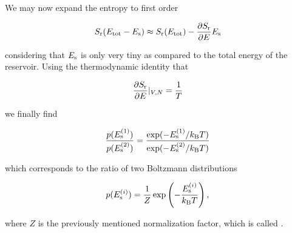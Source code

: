 \documentclass[letterpaper,10pt,english]{sphinxmanual}
\begin{document}
\sphinxAtStartPar
We may now expand the entropy to first order

\sphinxAtStartPar
\begin{equation}
S_{\rm r}(E_{\rm tot}-E_{\rm s})\approx S_{\rm r}(E_{\rm tot})-\frac{\partial S_{\rm r}}{\partial E}E_{\rm s}
\end{equation}

\sphinxAtStartPar
considering that \(E_{\rm s}\) is only very tiny as compared to the total energy of the reservoir. Using the thermodynamic identity that

\sphinxAtStartPar
\begin{equation}
\frac{\partial S_{\rm r}}{\partial E}|_{V,N}=\frac{1}{T}
\end{equation}

\sphinxAtStartPar
we finally find

\sphinxAtStartPar
\begin{equation}
\frac{p(E_{\rm s}^{(1)})}{p(E_{\rm s}^{(2)})}=\frac{\exp(-E_{\rm s}^{(1)}/k_{\rm B}T)}{\exp(-E_{\rm s}^{(2)}/k_{\rm B}T)}
\end{equation}

\sphinxAtStartPar
which corresponds to the ratio of two Boltzmann distributions

\sphinxAtStartPar
\begin{equation}
p(E_{\rm s}^{(i)})=\frac{1}{Z}\exp\left (- \frac{E_{\rm s}^{(i)}}{k_{\rm B} T}\right),
\end{equation}

\sphinxAtStartPar
where \(Z\) is the previously mentioned normalization factor, which is called .
\end{document}
